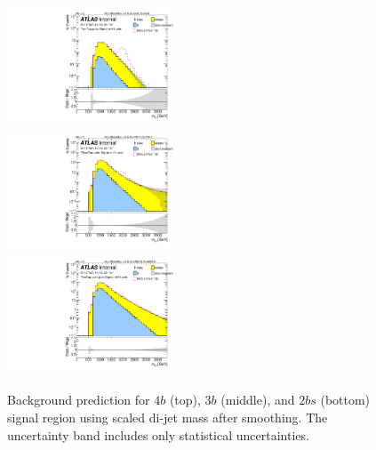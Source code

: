 \begin{figure}[htbp!]
\begin{center}
\includegraphics[angle=270, width=0.45\textwidth]{figures/boosted/Smooth/Moriond_bkg_9_FourTag_pole_Signal_mHH_pole_1_blind.pdf}\\
\includegraphics[angle=270, width=0.45\textwidth]{figures/boosted/Smooth/Moriond_bkg_9_ThreeTag_pole_Signal_mHH_pole_1_blind.pdf}\\
\includegraphics[angle=270, width=0.45\textwidth]{figures/boosted/Smooth/Moriond_bkg_9_TwoTag_split_pole_Signal_mHH_pole_1_blind.pdf}
\end{center}
\caption{Background prediction for $4b$ (top), $3b$ (middle), and $2bs$ (bottom) signal region using scaled di-jet mass after smoothing. The uncertainty band includes only statistical uncertainties.}
\label{fig:signal-region-mjjscaled-smooth-bkg-noSYS}
\end{figure}
